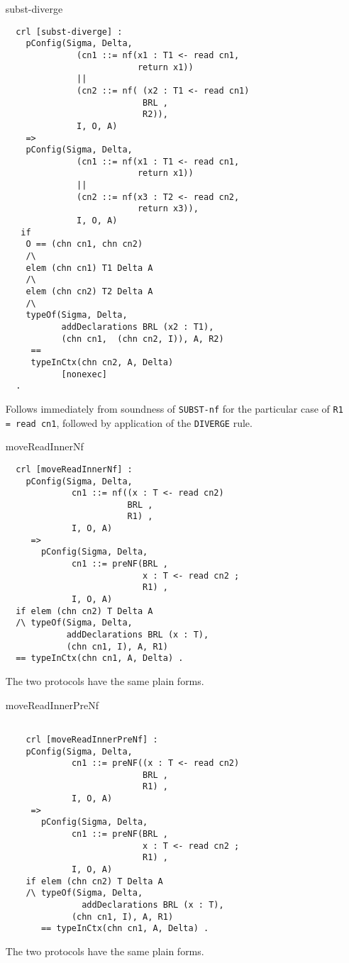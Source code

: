 \documentclass{article}
\begin{document}
\begin{itemize}
\item[subst-diverge]
 \begin{lstlisting}     
  crl [subst-diverge] : 
    pConfig(Sigma, Delta, 
              (cn1 ::= nf(x1 : T1 <- read cn1, 
                          return x1))
              || 
              (cn2 ::= nf( (x2 : T1 <- read cn1) 
                           BRL , 
                           R2)),
              I, O, A)    
    =>
    pConfig(Sigma, Delta, 
              (cn1 ::= nf(x1 : T1 <- read cn1, 
                          return x1))
              || 
              (cn2 ::= nf(x3 : T2 <- read cn2, 
                          return x3)),
              I, O, A) 
   if        
    O == (chn cn1, chn cn2)
    /\
    elem (chn cn1) T1 Delta A
    /\
    elem (chn cn2) T2 Delta A
    /\
    typeOf(Sigma, Delta, 
           addDeclarations BRL (x2 : T1), 
           (chn cn1,  (chn cn2, I)), A, R2) 
     == 
     typeInCtx(chn cn2, A, Delta)   
           [nonexec] 
  .      
       \end{lstlisting}     
  
   Follows immediately from soundness of \verb+SUBST-nf+ for the particular
 case of \verb+R1 = read cn1+, followed by application of the 
 \verb+DIVERGE+ rule.

\item[moveReadInnerNf]
 \begin{lstlisting}     
  crl [moveReadInnerNf] :
    pConfig(Sigma, Delta,
             cn1 ::= nf((x : T <- read cn2) 
                        BRL , 
                        R1) ,
             I, O, A)  
     => 
       pConfig(Sigma, Delta,
             cn1 ::= preNF(BRL , 
                           x : T <- read cn2 ; 
                           R1) ,
             I, O, A)    
  if elem (chn cn2) T Delta A 
  /\ typeOf(Sigma, Delta, 
            addDeclarations BRL (x : T), 
            (chn cn1, I), A, R1)
  == typeInCtx(chn cn1, A, Delta) .  
    \end{lstlisting}
    
  The two protocols have the same plain forms.  

\item[moveReadInnerPreNf]
 \begin{lstlisting} 
  
    crl [moveReadInnerPreNf] :
    pConfig(Sigma, Delta,
             cn1 ::= preNF((x : T <- read cn2) 
                           BRL , 
                           R1) ,
             I, O, A)  
     => 
       pConfig(Sigma, Delta,
             cn1 ::= preNF(BRL , 
                           x : T <- read cn2 ; 
                           R1) ,
             I, O, A)  
    if elem (chn cn2) T Delta A 
    /\ typeOf(Sigma, Delta, 
               addDeclarations BRL (x : T), 
             (chn cn1, I), A, R1) 
       == typeInCtx(chn cn1, A, Delta) .
       \end{lstlisting}
       
    The two protocols have the same plain forms.  

\end{itemize}

\end{document}
